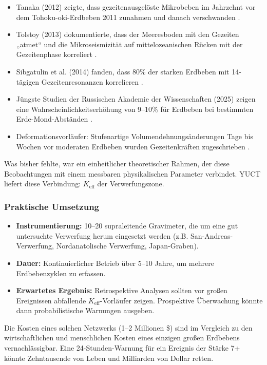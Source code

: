 \documentclass[12pt,a4paper]{article}
\theoremstyle{remark}
\begin{document}
	\begin{itemize}
		\item Tanaka (2012) zeigte, dass gezeitenausgelöste Mikrobeben im Jahrzehnt vor dem Tohoku-oki-Erdbeben 2011 zunahmen und danach verschwanden \cite{Tanaka2012}.
		\item Tolstoy (2013) dokumentierte, dass der Meeresboden mit den Gezeiten „atmet“ und die Mikroseismizität auf mittelozeanischen Rücken mit der Gezeitenphase korreliert \cite{Tolstoy2013}.
		\item Sibgatulin et al. (2014) fanden, dass 80\% der starken Erdbeben mit 14-tägigen Gezeitenresonanzen korrelieren \cite{Sibgatulin2014}.
		\item Jüngste Studien der Russischen Akademie der Wissenschaften (2025) zeigen eine Wahrscheinlichkeitserhöhung von 9–10\% für Erdbeben bei bestimmten Erde-Mond-Abständen \cite{RAN2025}.
		\item Deformationsvorläufer: Stufenartige Volumendehnungsänderungen Tage bis Wochen vor moderaten Erdbeben wurden Gezeitenkräften zugeschrieben \cite{DeformationPrecursors2024}.
	\end{itemize}
	
	Was bisher fehlte, war ein einheitlicher theoretischer Rahmen, der diese Beobachtungen mit einem messbaren physikalischen Parameter verbindet. YUCT liefert diese Verbindung: \(K_{\mathrm{eff}}\) der Verwerfungszone.
	
	\subsubsection{Praktische Umsetzung}
	
	\begin{itemize}
		\item \textbf{Instrumentierung:} 10–20 supraleitende Gravimeter, die um eine gut untersuchte Verwerfung herum eingesetzt werden (z.B. San-Andreas-Verwerfung, Nordanatolische Verwerfung, Japan-Graben).
		\item \textbf{Dauer:} Kontinuierlicher Betrieb über 5–10 Jahre, um mehrere Erdbebenzyklen zu erfassen.
		\item \textbf{Erwartetes Ergebnis:} Retrospektive Analysen sollten vor großen Ereignissen abfallende \(K_{\mathrm{eff}}\)-Vorläufer zeigen. Prospektive Überwachung könnte dann probabilistische Warnungen ausgeben.
	\end{itemize}
	
	Die Kosten eines solchen Netzwerks (1–2 Millionen \$) sind im Vergleich zu den wirtschaftlichen und menschlichen Kosten eines einzigen großen Erdbebens vernachlässigbar. Eine 24-Stunden-Warnung für ein Ereignis der Stärke 7+ könnte Zehntausende von Leben und Milliarden von Dollar retten.
	
\end{document}
